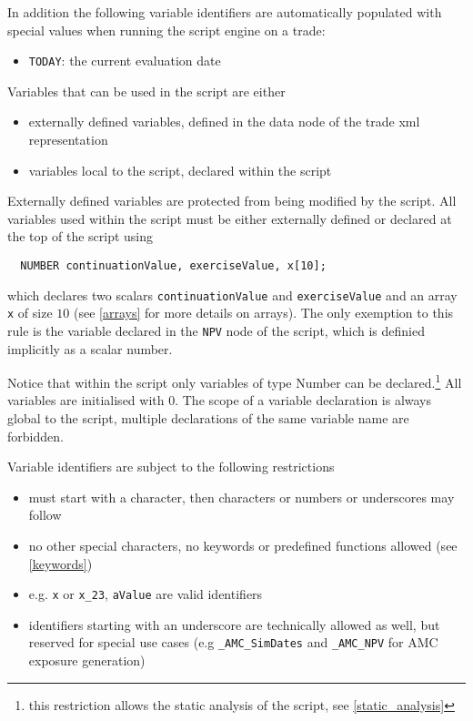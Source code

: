 In addition the following variable identifiers are automatically populated with special values when running the script
engine on a trade:

\begin{itemize}
\item \verb+TODAY+: the current evaluation date
\end{itemize}


Variables that can be used in the script are either

\begin{itemize}
\item externally defined variables, defined in the data node of the trade xml representation
\item variables local to the script, declared within the script
\end{itemize}

Externally defined variables are protected from being modified by the script. All variables used within the script must
be either externally defined or declared at the top of the script using

\begin{verbatim}
  NUMBER continuationValue, exerciseValue, x[10];
\end{verbatim}

which declares two scalars \verb+continuationValue+ and \verb+exerciseValue+ and an array \verb+x+ of size $10$ (see
\ref{arrays} for more details on arrays). The only exemption to this rule is the variable declared in the \verb+NPV+
node of the script, which is definied implicitly as a scalar number.

Notice that within the script only variables of type Number can be declared.\footnote{this restriction allows the static
  analysis of the script\ifdefined\STModuleDoc, see \ref{static_analysis}\fi
} All variables are initialised with $0$. The scope of a variable
declaration is always global to the script, multiple declarations of the same variable name are forbidden.

Variable identifiers are subject to the following restrictions

\begin{itemize}
\item must start with a character, then characters or numbers or underscores may follow
\item no other special characters, no keywords or predefined functions allowed (see \ref{keywords})
\item e.g. {\tt x} or {\tt x\_23}, {\tt aValue} are valid identifiers
\item identifiers starting with an underscore are technically allowed as well, but reserved for special use cases (e.g
  \verb+_AMC_SimDates+ and \verb+_AMC_NPV+ for AMC exposure generation)
\end{itemize}

